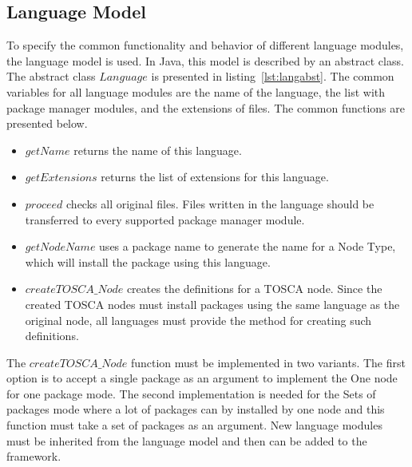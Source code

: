 \subsection*{Language Model}
To specify the common functionality and behavior of different language modules, the language model is used. 
In Java, this model is described by an abstract class. 
The abstract class $Language$ is presented in listing~\ref{lst:langabst}.
The common variables for all language modules are the name of the language, the list with package manager modules, and the extensions of files.
The common functions are presented below.
\begin{itemize}
	\item $getName$ returns the name of this language.
	\item $getExtensions$ returns the list of extensions for this language.
	\item $proceed$ checks all original files.  
	Files written in the language should be transferred to every supported package manager module.
	\item $getNodeName$ uses a package name to generate the name for a Node Type, which will install the package using this language.
	\item $createTOSCA\_Node$ creates the definitions for a TOSCA node. 
	Since the created TOSCA nodes must install packages using the same language as the original node, all languages must provide the method for creating such definitions.
\end{itemize}
The $createTOSCA\_Node$ function must be implemented in two variants. 
The first option is to accept a single package as an argument to implement the One node for one package mode.
The second implementation is needed for the Sets of packages mode where a lot of packages can by installed by one node and this function must take a set of packages as an argument.
New language modules must be inherited from the language model and then can be added to the framework.
